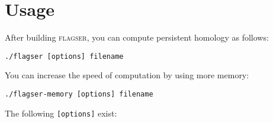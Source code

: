 \documentclass{amsart}
\theoremstyle{definition}
\begin{document}
\section{Usage}
\noindent
After building \textsc{flagser}, you can compute persistent homology as follows:

\vspace{1em}

\begin{verbatim}./flagser [options] filename\end{verbatim}

\vspace{1em}

You can increase the speed of computation by using more memory:

\vspace{1em}

\begin{verbatim}./flagser-memory [options] filename\end{verbatim}

\vspace{1em}

\noindent
The following \texttt{[options]} exist:
\end{document}
